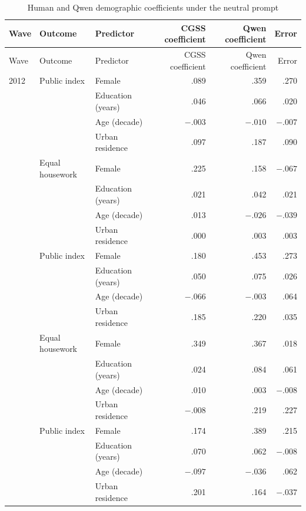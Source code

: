 \documentclass[11pt]{article}
\begin{document}
\begin{landscape}
\begin{longtable}{lllrrr}
\caption{Human and Qwen demographic coefficients under the neutral prompt}
\label{tab:s6-gradients}\\
\toprule
Wave & Outcome & Predictor & CGSS coefficient & Qwen coefficient & Error \\
\midrule
\endfirsthead
\toprule
Wave & Outcome & Predictor & CGSS coefficient & Qwen coefficient & Error \\
\midrule
\endhead
2012 & Public index & Female & .089 & .359 & .270 \\
     &              & Education (years) & .046 & .066 & .020 \\
     &              & Age (decade) & $-.003$ & $-.010$ & $-.007$ \\
     &              & Urban residence & .097 & .187 & .090 \\
     & Equal housework & Female & .225 & .158 & $-.067$ \\
     &                 & Education (years) & .021 & .042 & .021 \\
     &                 & Age (decade) & .013 & $-.026$ & $-.039$ \\
     &                 & Urban residence & .000 & .003 & .003 \\
\addlinespace
2018 & Public index & Female & .180 & .453 & .273 \\
     &              & Education (years) & .050 & .075 & .026 \\
     &              & Age (decade) & $-.066$ & $-.003$ & .064 \\
     &              & Urban residence & .185 & .220 & .035 \\
     & Equal housework & Female & .349 & .367 & .018 \\
     &                 & Education (years) & .024 & .084 & .061 \\
     &                 & Age (decade) & .010 & .003 & $-.008$ \\
     &                 & Urban residence & $-.008$ & .219 & .227 \\
\addlinespace
2021 & Public index & Female & .174 & .389 & .215 \\
     &              & Education (years) & .070 & .062 & $-.008$ \\
     &              & Age (decade) & $-.097$ & $-.036$ & .062 \\
     &              & Urban residence & .201 & .164 & $-.037$ \\

\end{longtable}
\end{landscape}
\end{document}
